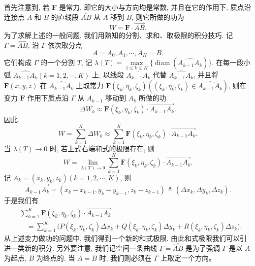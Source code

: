 \documentclass[12pt,fontset=fandol]{ctexart}
\begin{document}
首先注意到, 若 $\boldsymbol F$ 是常力, 即它的大小与方向均是常数, 并且在它的作用下, 质点沿连接点 $A$ 和 $B$ 的直线段 $\overline{AB}$ 从 $A$ 移到 $B$, 则它所做的功为
\[
  W=\boldsymbol F\cdot\overrightarrow{AB}.
\]
为了求解上述的一般问题, 我们用熟知的分割、求和、取极限的积分技巧. 记 $\Gamma=\widehat{AB}$, 沿 $\Gamma$ 依次取分点
\[
  A=A_0,A_1,\cdots,A_K=B.
\]
它们构成 $\Gamma$ 的一个分割 $T$, 记 $\lambda(T)=\max\limits_{1\leqslant k\leqslant K}\{\operatorname{diam}(\widehat{A_{k-1}A_k})\}$. 在每一段小弧 $\widehat{A_{k-1}A_k}(k=1,2,\cdots,K)$ 上, 以线段 $\overline{A_{k-1}A_k}$ 代替 $\widehat{A_{k-1}A_k}$, 并且将 $\boldsymbol F(x,y,z)$ 在 $\widehat{A_{k-1}A_k}$ 上取常力 $\boldsymbol F(\xi_k,\eta_k,\zeta_k)((\xi_k,\eta_k,\zeta_k)\in\widehat{A_{k-1}A_k})$, 则在变力 $\boldsymbol F$ 作用下质点沿 $\Gamma$ 从 $A_{k-1}$ 移动到 $A_k$ 所做的功
\[
  \Delta W_k\approx \boldsymbol F(\xi_k,\eta_k,\zeta_k)\cdot\overrightarrow{A_{k-1}A_k}.
\]
因此
\[
  W=\sum_{k=1}^K\Delta W_k
  \approx \sum_{k=1}^K \boldsymbol F(\xi_k,\eta_k,\zeta_k)\cdot\overrightarrow{A_{k-1}A_k}.
\]
当 $\lambda(T)\to0$ 时, 若上式右端和式的极限存在, 则
\[
  W=\lim_{\lambda(T)\to0}\sum_{k=1}^K
  \boldsymbol F(\xi_k,\eta_k,\zeta_k)\cdot\overrightarrow{A_{k-1}A_k}.
\]
记 $A_k=(x_k,y_k,z_k)(k=1,2,\cdots,K)$, 则
\[
  \overrightarrow{A_{k-1}A_k}
  =(x_k-x_{k-1},y_k-y_{k-1},z_k-z_{k-1})
  \triangleq(\Delta x_k,\Delta y_k,\Delta z_k).
\]
于是我们有
\[
\begin{aligned}
  &\sum_{k=1}^K \boldsymbol F(\xi_k,\eta_k,\zeta_k)\cdot\overrightarrow{A_{k-1}A_k}\\
  &\quad=\sum_{k=1}^K\bigl(P(\xi_k,\eta_k,\zeta_k)\Delta x_k
    +Q(\xi_k,\eta_k,\zeta_k)\Delta y_k
    +R(\xi_k,\eta_k,\zeta_k)\Delta z_k\bigr).
\end{aligned}
\]
从上述变力做功的问题中, 我们得到一个新的和式极限. 由此和式极限我们可以引进一类新的积分. 另外要注意, 我们记空间一条曲线 $\Gamma=\widehat{AB}$ 是为了强调 $\Gamma$ 是以 $A$ 为起点, $B$ 为终点的. 当 $A=B$ 时, 我们则必须在 $\Gamma$ 上取定一个方向。
\end{document}
